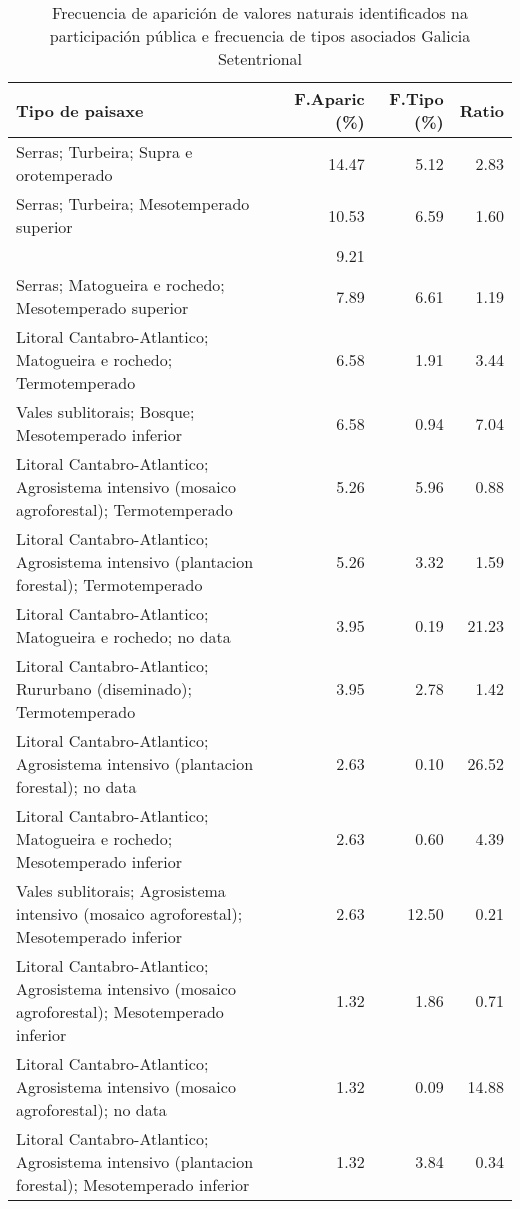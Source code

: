 \begin{table}[p]
\centering
\caption{Frecuencia de aparición de valores naturais identificados na participación pública e frecuencia de tipos asociados Galicia Setentrional} 
\label{vsixotnat10}
\begin{tabular}{lrrr}
  \hline
Tipo de paisaxe & F.Aparic (\%) & F.Tipo (\%) & Ratio \\ 
  \hline
Serras; Turbeira; Supra e orotemperado & 14.47 & 5.12 & 2.83 \\ 
  Serras; Turbeira; Mesotemperado superior & 10.53 & 6.59 & 1.60 \\ 
   & 9.21 &  &  \\ 
  Serras; Matogueira e rochedo; Mesotemperado superior & 7.89 & 6.61 & 1.19 \\ 
  Litoral Cantabro-Atlantico; Matogueira e rochedo; Termotemperado & 6.58 & 1.91 & 3.44 \\ 
  Vales sublitorais; Bosque; Mesotemperado inferior & 6.58 & 0.94 & 7.04 \\ 
  Litoral Cantabro-Atlantico; Agrosistema intensivo (mosaico agroforestal); Termotemperado & 5.26 & 5.96 & 0.88 \\ 
  Litoral Cantabro-Atlantico; Agrosistema intensivo (plantacion forestal); Termotemperado & 5.26 & 3.32 & 1.59 \\ 
  Litoral Cantabro-Atlantico; Matogueira e rochedo; no data & 3.95 & 0.19 & 21.23 \\ 
  Litoral Cantabro-Atlantico; Rururbano (diseminado); Termotemperado & 3.95 & 2.78 & 1.42 \\ 
  Litoral Cantabro-Atlantico; Agrosistema intensivo (plantacion forestal); no data & 2.63 & 0.10 & 26.52 \\ 
  Litoral Cantabro-Atlantico; Matogueira e rochedo; Mesotemperado inferior & 2.63 & 0.60 & 4.39 \\ 
  Vales sublitorais; Agrosistema intensivo (mosaico agroforestal); Mesotemperado inferior & 2.63 & 12.50 & 0.21 \\ 
  Litoral Cantabro-Atlantico; Agrosistema intensivo (mosaico agroforestal); Mesotemperado inferior & 1.32 & 1.86 & 0.71 \\ 
  Litoral Cantabro-Atlantico; Agrosistema intensivo (mosaico agroforestal); no data & 1.32 & 0.09 & 14.88 \\ 
  Litoral Cantabro-Atlantico; Agrosistema intensivo (plantacion forestal); Mesotemperado inferior & 1.32 & 3.84 & 0.34 \\ 

\end{tabular}
\end{table}
